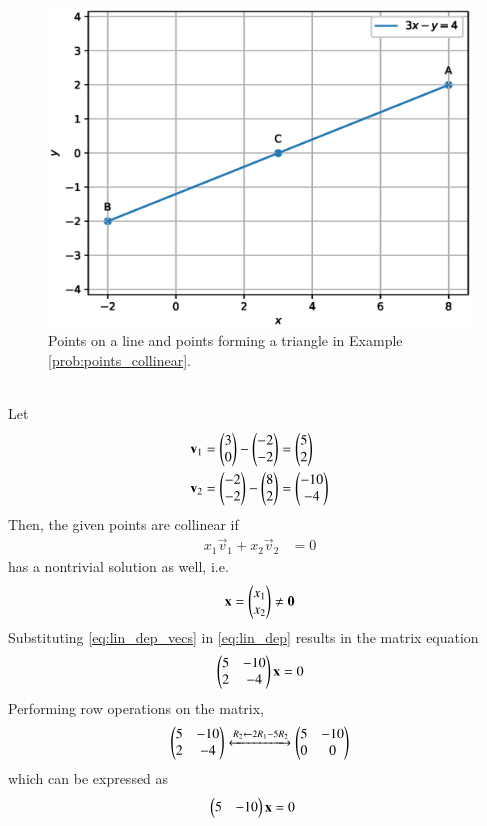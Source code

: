 \begin{enumerate}[label=\thesection.\arabic*.,ref=\thesection.\theenumi]
\label{prob:points_collinear}
\begin{figure}
\centering
\includegraphics[width=0.4\columnwidth]{./figs/line/points_collinear.eps}
\caption{ Points on a line and points forming a triangle in Example \ref{prob:points_collinear}.}%
\label{fig:line_collinear}
\end{figure}
\\
\solution 
Let
\begin{align}
\begin{split}
\mathbf{v}_1 &= \begin{pmatrix}3\\0\end{pmatrix}-\begin{pmatrix}-2\\-2\end{pmatrix} = \begin{pmatrix}5\\2\end{pmatrix}
\\
\mathbf{v}_2 &=\begin{pmatrix}-2\\-2\end{pmatrix}-\begin{pmatrix}8\\2\end{pmatrix} = \begin{pmatrix}-10\\-4\end{pmatrix}
\end{split}
\label{eq:lin_dep_vecs}
\end{align}
Then, the given points are collinear if 
\begin{align}
\label{eq:lin_dep}
x_1\vec{v}_1+x_2\vec{v}_2 &= 0 
\end{align}
has a nontrivial solution as well, i.e.
\begin{align}
\mathbf{x} =\begin{pmatrix}x_1\\x_2\end{pmatrix} \ne \mathbf{0}
\end{align}
Substituting \eqref{eq:lin_dep_vecs}
in \eqref{eq:lin_dep} results in the matrix  equation
\begin{align}
\begin{pmatrix}5 & -10\\ 2 & -4\end{pmatrix}\mathbf{x} = 0
\end{align}
Performing row operations on the matrix,
\begin{align}
\begin{pmatrix}5 & -10\\ 2 & -4\end{pmatrix}
\xleftrightarrow[]{R_2\leftarrow 2R_1-5R_2}
\begin{pmatrix}5 & -10\\ 0 & 0\end{pmatrix}
\end{align}
which can be expressed as
%
\begin{align}
\myvec{5 & -10}\vec{x} &= 0

\end{align}
\end{enumerate}
